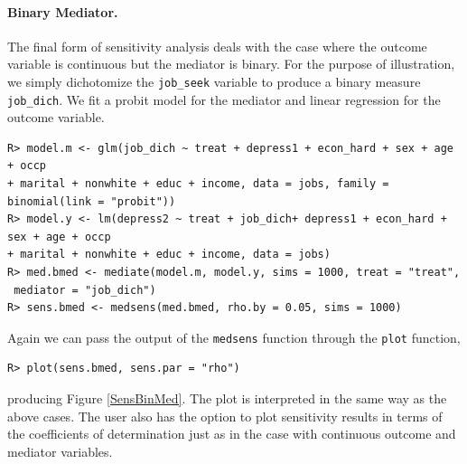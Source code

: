 \documentclass[11pt,letterpaper]{article}
\theoremstyle{plain}
\begin{document}
\paragraph{Binary Mediator.}
The final form of sensitivity analysis deals with the case where the
outcome variable is continuous but the mediator is binary.  For the
purpose of illustration, we simply dichotomize the \texttt{job\_seek}
variable to produce a binary measure \texttt{job\_dich}. We fit a
probit model for the mediator and linear regression for the outcome
variable.
\begin{verbatim}
R> model.m <- glm(job_dich ~ treat + depress1 + econ_hard + sex + age + occp
+ marital + nonwhite + educ + income, data = jobs, family = binomial(link = "probit"))
R> model.y <- lm(depress2 ~ treat + job_dich+ depress1 + econ_hard + sex + age + occp
+ marital + nonwhite + educ + income, data = jobs)
R> med.bmed <- mediate(model.m, model.y, sims = 1000, treat = "treat",
 mediator = "job_dich")
R> sens.bmed <- medsens(med.bmed, rho.by = 0.05, sims = 1000)
\end{verbatim}
Again we can pass the output of the \texttt{medsens} function through the \texttt{plot} function,
\begin{verbatim}
R> plot(sens.bmed, sens.par = "rho")
\end{verbatim}
producing Figure \ref{SensBinMed}. The plot is interpreted in the same
way as the above cases. The user also has the option to plot sensitivity results
in terms of the coefficients of determination just as in the case with
continuous outcome and mediator variables.
\end{document}
